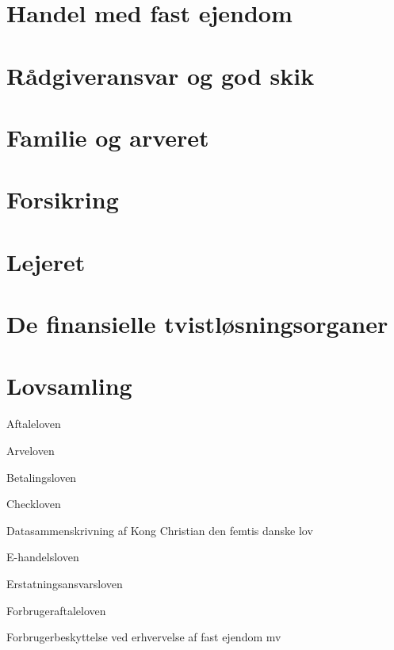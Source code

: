 \documentclass[]{book}
\begin{document}
\hypertarget{handel-med-fast-ejendom}{%
\chapter{Handel med fast ejendom}\label{handel-med-fast-ejendom}}

\hypertarget{radgiveransvar-og-god-skik}{%
\chapter{Rådgiveransvar og god skik}\label{radgiveransvar-og-god-skik}}

\hypertarget{familie-og-arveret}{%
\chapter{Familie og arveret}\label{familie-og-arveret}}

\hypertarget{forsikring}{%
\chapter{Forsikring}\label{forsikring}}

\hypertarget{lejeret}{%
\chapter{Lejeret}\label{lejeret}}

\hypertarget{de-finansielle-tvistlsningsorganer}{%
\chapter{De finansielle tvistløsningsorganer}\label{de-finansielle-tvistlsningsorganer}}

\hypertarget{lovsamling}{%
\chapter{Lovsamling}\label{lovsamling}}

Aftaleloven

Arveloven

Betalingsloven

Checkloven

Datasammenskrivning af Kong Christian den femtis danske lov

E-handelsloven

Erstatningsansvarsloven

Forbrugeraftaleloven

Forbrugerbeskyttelse ved erhvervelse af fast ejendom mv
\end{document}
